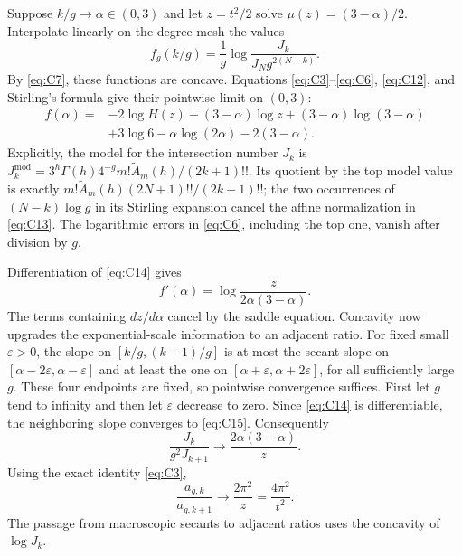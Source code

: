 Suppose \(k/g\to\alpha\in(0,3)\) and let \(z=t^2/2\) solve
\(\mu(z)=(3-\alpha)/2\). Interpolate linearly on the degree mesh the
values \begin{equation}
f_g(k/g)=\frac1g\log
               \frac{J_k}{J_Ng^{2(N-k)}}.
 \label{eq:C13}
\end{equation} By \eqref{eq:C7}, these functions are concave. Equations \eqref{eq:C3}--\eqref{eq:C6}, \eqref{eq:C12},
and Stirling's formula give their pointwise limit on \((0,3)\): \begin{equation}
\begin{aligned}
 f(\alpha)={}&-2\log H(z)-(3-\alpha)\log z
 +(3-\alpha)\log(3-\alpha)\\
 &+3\log6-\alpha\log(2\alpha)-2(3-\alpha).
 \end{aligned}
 \label{eq:C14}
\end{equation} Explicitly, the model for the intersection number \(J_k\) is
\(J_k^{\mathrm{mod}}=3^h\Gamma(h)4^{-g}m!\widetilde A_m(h)/(2k+1)!!\). Its quotient
by the top model value is exactly \(m! \widetilde A_m(h)(2N+1)!!/(2k+1)!!\); the
two occurrences of \((N-k)\log g\) in its Stirling expansion cancel the
affine normalization in \eqref{eq:C13}. The logarithmic errors in \eqref{eq:C6}, including
the top one, vanish after division by \(g\).

Differentiation of \eqref{eq:C14} gives \begin{equation}
f'(\alpha)=\log\frac{z}{2\alpha(3-\alpha)}.
 \label{eq:C15}
\end{equation} The terms containing \(dz/d\alpha\) cancel by the saddle equation.
Concavity now upgrades the exponential-scale information to an adjacent
ratio. For fixed small \(\varepsilon>0\), the slope on \([k/g,(k+1)/g]\)
is at most the secant slope on
\([\alpha-2\varepsilon,\alpha-\varepsilon]\) and at least the one on
\([\alpha+\varepsilon,\alpha+2\varepsilon]\), for all sufficiently large
\(g\). These four endpoints are fixed, so pointwise convergence
suffices. First let \(g\) tend to infinity and then let \(\varepsilon\)
decrease to zero. Since \eqref{eq:C14} is differentiable, the neighboring slope
converges to \eqref{eq:C15}. Consequently \begin{equation}
\frac{J_k}{g^2J_{k+1}}\longrightarrow
            \frac{2\alpha(3-\alpha)}z.
 \label{eq:C16}
\end{equation} Using the exact identity \eqref{eq:C3}, \begin{equation}
\frac{a_{g,k}}{a_{g,k+1}}\longrightarrow
      \frac{2\pi^2}{z}=\frac{4\pi^2}{t^2}.
 \label{eq:C17}
\end{equation} The passage from macroscopic secants to adjacent ratios uses the
concavity of $\log J_k$.


